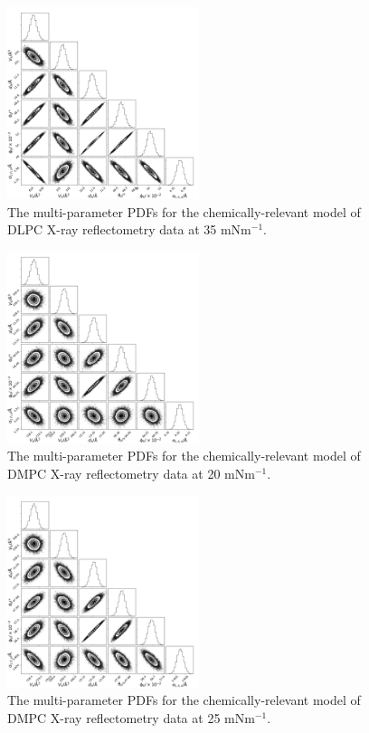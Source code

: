 \documentclass[11pt,a4paper]{paper}
\begin{document}
\begin{figure}[H]
	\centering
	\includegraphics[width=0.50\textwidth]{figures/dlpc4_all_corner}
	\caption{The multi-parameter PDFs for the chemically-relevant model of DLPC X-ray reflectometry data at 35 mNm$^{-1}$.}
	\label{fig:dlpc5}
\end{figure}
\begin{figure}[H]
	\centering
	\includegraphics[width=0.50\textwidth]{figures/dmpc1_all_corner}
	\caption{The multi-parameter PDFs for the chemically-relevant model of DMPC X-ray reflectometry data at 20 mNm$^{-1}$.}
	\label{fig:dmpc2}
\end{figure}
\begin{figure}[H]
	\centering
	\includegraphics[width=0.50\textwidth]{figures/dmpc2_all_corner}
	\caption{The multi-parameter PDFs for the chemically-relevant model of DMPC X-ray reflectometry data at 25 mNm$^{-1}$.}
	\label{fig:dmpc3}
\end{figure}
\end{document}
